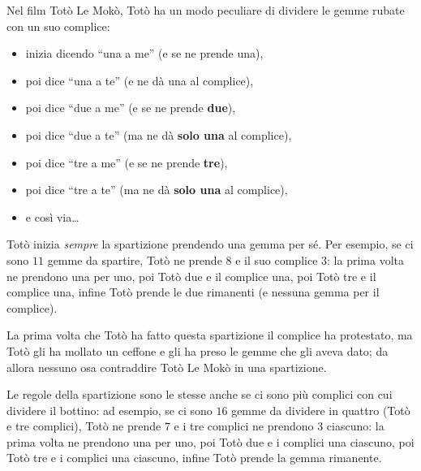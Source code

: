 \usepackage{xcolor}
\usepackage{afterpage}
\usepackage{pifont,mdframed}
\usepackage[bottom,symbol]{footmisc}


\newcommand{\inputfile}{\texttt{input.txt}}
\newcommand{\outputfile}{\texttt{output.txt}}


Nel film Totò Le Mokò, Totò ha un modo peculiare di dividere le gemme rubate con un suo complice:

\begin{itemize}
  \item inizia dicendo ``una a me'' (e se ne prende una),
  \item poi dice ``una a te'' (e ne dà una al complice),
  \item poi dice ``due a me'' (e se ne prende \textbf{due}),
  \item poi dice ``due a te'' (ma ne dà \textbf{solo una} al complice),
  \item poi dice ``tre a me'' (e se ne prende \textbf{tre}),
  \item poi dice ``tre a te'' (ma ne dà \textbf{solo una} al complice),
  \item e così via\dots
\end{itemize}

Totò inizia \emph{sempre} la spartizione prendendo una gemma per sé. Per esempio, se ci sono $11$ gemme da spartire, Totò ne prende $8$ e il suo complice $3$: la prima volta ne prendono una per uno, poi Totò due e il complice una, poi Totò tre e il complice una, infine Totò prende le due rimanenti (e nessuna gemma per il complice).

La prima volta che Totò ha fatto questa spartizione il complice ha protestato, ma Totò gli ha mollato un ceffone e gli ha preso le gemme che gli aveva dato; da allora nessuno osa contraddire Totò Le Mokò in una spartizione.

Le regole della spartizione sono le stesse anche se ci sono più complici con cui dividere il bottino: ad esempio, se ci sono $16$ gemme da dividere in quattro (Totò e tre complici), Totò ne prende $7$ e i tre complici ne prendono $3$ ciascuno: la prima volta ne prendono una per uno, poi Totò due e i complici una ciascuno, poi Totò tre e i complici una ciascuno, infine Totò prende la gemma rimanente.

